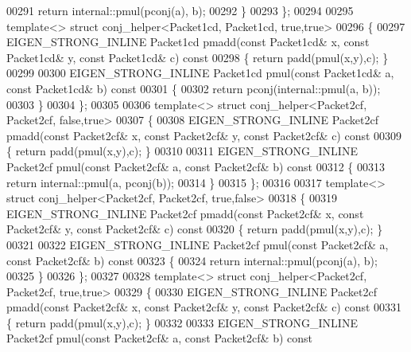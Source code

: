 \begin{DoxyCode}
00291     \textcolor{keywordflow}{return} internal::pmul(pconj(a), b);
00292   \}
00293 \};
00294 
00295 \textcolor{keyword}{template}<> \textcolor{keyword}{struct }conj\_helper<Packet1cd, Packet1cd, true,true>
00296 \{
00297   EIGEN\_STRONG\_INLINE Packet1cd pmadd(\textcolor{keyword}{const} Packet1cd& x, \textcolor{keyword}{const} Packet1cd& y, \textcolor{keyword}{const} Packet1cd& c)\textcolor{keyword}{ const}
00298 \textcolor{keyword}{  }\{ \textcolor{keywordflow}{return} padd(pmul(x,y),c); \}
00299 
00300   EIGEN\_STRONG\_INLINE Packet1cd pmul(\textcolor{keyword}{const} Packet1cd& a, \textcolor{keyword}{const} Packet1cd& b)\textcolor{keyword}{ const}
00301 \textcolor{keyword}{  }\{
00302     \textcolor{keywordflow}{return} pconj(internal::pmul(a, b));
00303   \}
00304 \};
00305 
00306 \textcolor{keyword}{template}<> \textcolor{keyword}{struct }conj\_helper<Packet2cf, Packet2cf, false,true>
00307 \{
00308   EIGEN\_STRONG\_INLINE Packet2cf pmadd(\textcolor{keyword}{const} Packet2cf& x, \textcolor{keyword}{const} Packet2cf& y, \textcolor{keyword}{const} Packet2cf& c)\textcolor{keyword}{ const}
00309 \textcolor{keyword}{  }\{ \textcolor{keywordflow}{return} padd(pmul(x,y),c); \}
00310 
00311   EIGEN\_STRONG\_INLINE Packet2cf pmul(\textcolor{keyword}{const} Packet2cf& a, \textcolor{keyword}{const} Packet2cf& b)\textcolor{keyword}{ const}
00312 \textcolor{keyword}{  }\{
00313     \textcolor{keywordflow}{return} internal::pmul(a, pconj(b));
00314   \}
00315 \};
00316 
00317 \textcolor{keyword}{template}<> \textcolor{keyword}{struct }conj\_helper<Packet2cf, Packet2cf, true,false>
00318 \{
00319   EIGEN\_STRONG\_INLINE Packet2cf pmadd(\textcolor{keyword}{const} Packet2cf& x, \textcolor{keyword}{const} Packet2cf& y, \textcolor{keyword}{const} Packet2cf& c)\textcolor{keyword}{ const}
00320 \textcolor{keyword}{  }\{ \textcolor{keywordflow}{return} padd(pmul(x,y),c); \}
00321 
00322   EIGEN\_STRONG\_INLINE Packet2cf pmul(\textcolor{keyword}{const} Packet2cf& a, \textcolor{keyword}{const} Packet2cf& b)\textcolor{keyword}{ const}
00323 \textcolor{keyword}{  }\{
00324     \textcolor{keywordflow}{return} internal::pmul(pconj(a), b);
00325   \}
00326 \};
00327 
00328 \textcolor{keyword}{template}<> \textcolor{keyword}{struct }conj\_helper<Packet2cf, Packet2cf, true,true>
00329 \{
00330   EIGEN\_STRONG\_INLINE Packet2cf pmadd(\textcolor{keyword}{const} Packet2cf& x, \textcolor{keyword}{const} Packet2cf& y, \textcolor{keyword}{const} Packet2cf& c)\textcolor{keyword}{ const}
00331 \textcolor{keyword}{  }\{ \textcolor{keywordflow}{return} padd(pmul(x,y),c); \}
00332 
00333   EIGEN\_STRONG\_INLINE Packet2cf pmul(\textcolor{keyword}{const} Packet2cf& a, \textcolor{keyword}{const} Packet2cf& b)\textcolor{keyword}{ const}

\end{DoxyCode}
